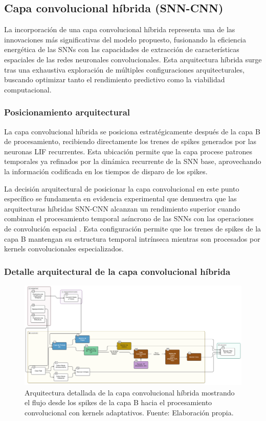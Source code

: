 \subsection{Capa convolucional híbrida (SNN-CNN)}

La incorporación de una capa convolucional híbrida representa una de las innovaciones más significativas del modelo propuesto, fusionando la eficiencia energética de las SNNs con las capacidades de extracción de características espaciales de las redes neuronales convolucionales. Esta arquitectura híbrida surge tras una exhaustiva exploración de múltiples configuraciones arquitecturales, buscando optimizar tanto el rendimiento predictivo como la viabilidad computacional.

\subsubsection {Posicionamiento arquitectural}

La capa convolucional híbrida se posiciona estratégicamente después de la capa B de procesamiento, recibiendo directamente los trenes de spikes generados por las neuronas LIF recurrentes. Esta ubicación permite que la capa procese patrones temporales ya refinados por la dinámica recurrente de la SNN base, aprovechando la información codificada en los tiempos de disparo de los spikes.

La decisión arquitectural de posicionar la capa convolucional en este punto específico se fundamenta en evidencia experimental que demuestra que las arquitecturas híbridas SNN-CNN alcanzan un rendimiento superior cuando combinan el procesamiento temporal asíncrono de las SNNs con las operaciones de convolución espacial \cite{sanaullah_hybrid_2024}. Esta configuración permite que los trenes de spikes de la capa B mantengan su estructura temporal intrínseca mientras son procesados por kernels convolucionales especializados.

\subsubsection{Detalle arquitectural de la capa convolucional híbrida}

\begin{figure}[!htb]
    \centering
    \includegraphics[width=1.0\textwidth]{Imagenes/Arquitectura detallada SNN.png}
    \caption{Arquitectura detallada de la capa convolucional híbrida mostrando el flujo desde los spikes de la capa B hacia el procesamiento convolucional con kernels adaptativos. Fuente: Elaboración propia.}
    \label{fig:Arquitectura detallada SNN}
\end{figure}

